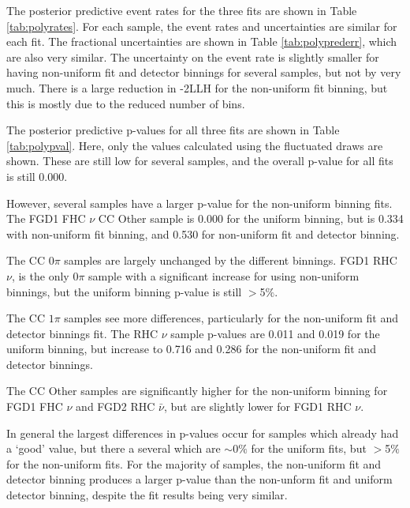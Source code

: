 The posterior predictive event rates for the three fits are shown in Table \ref{tab:polyrates}. For each sample, the event rates and uncertainties are similar for each fit. The fractional uncertainties are shown in Table \ref{tab:polyprederr}, which are also very similar. The uncertainty on the event rate is slightly smaller for having non-uniform fit and detector binnings for several samples, but not by very much. There is a large reduction in -2LLH for the non-uniform fit binning, but this is mostly due to the reduced number of bins.

The posterior predictive p-values for all three fits are shown in Table \ref{tab:polypval}. Here, only the values calculated using the fluctuated draws are shown. These are still low for several samples, and the overall p-value for all fits is still 0.000. 

However, several samples have a larger p-value for the non-uniform binning fits. The FGD1 FHC $\nu$ CC Other sample is 0.000 for the uniform binning, but is 0.334 with non-uniform fit binning, and 0.530 for non-uniform fit and detector binning. 

The CC $0\pi$ samples are largely unchanged by the different binnings. FGD1 RHC $\nu$, is the only 0$\pi$ sample with a significant increase for using non-uniform binnings, but the uniform binning p-value is still $>$5$\%$.

The CC $1\pi$ samples see more differences, particularly for the non-uniform fit and detector binnings fit. The RHC $\nu$ sample p-values are 0.011 and 0.019 for the uniform binning, but increase to 0.716 and 0.286 for the non-uniform fit and detector binnings. 

The CC Other samples are significantly higher for the non-uniform binning for FGD1 FHC $\nu$ and FGD2 RHC $\bar{\nu}$, but are slightly lower for FGD1 RHC $\nu$. 

In general the largest differences in p-values occur for samples which already had a `good' value, but there a several which are $\sim$0$\%$ for the uniform fits, but $>$5$\%$ for the non-uniform fits. For the majority of samples, the non-uniform fit and detector binning produces a larger p-value than the non-unform fit and uniform detector binning, despite the fit results being very similar. 

